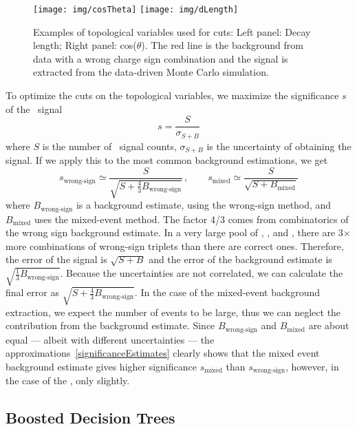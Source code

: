\begin{figure}[htb]
\centering
\texttt{[image: img/cosTheta]}
\texttt{[image: img/dLength]}
\caption{Examples of topological variables used for cuts: Left panel: Decay length; Right panel: cos($\theta$)\@. The red line is the background from data with a wrong charge sign combination and the signal is extracted from the data-driven Monte Carlo simulation.}
\label{fig:optimization}
\end{figure}

To optimize the cuts on the topological variables, we maximize the significance $s$ of the \Lambdac\ signal
\begin{equation} \label{significance}
 s = \frac{S}{\sigma_{S+B}}
\end{equation}
where $S$ is the number of \Lambdac\ signal counts, $\sigma_{S+B}$ is the uncertainty of obtaining the signal.
If we apply this to the most common background estimations, we get
\begin{equation} \label{significanceEstimates}
  s_\text{wrong-sign} \simeq \frac{S}{\sqrt{S+\frac{4}{3}B_\text{wrong-sign}}}\,, \qquad
 s_\text{mixed} \simeq \frac{S}{\sqrt{S + B_\text{mixed}}} 
\end{equation}
where $B_\text{wrong-sign}$ is a background estimate, using the wrong-sign method, and $B_\text{mixed}$ uses the mixed-event method. The factor 4/3 comes from combinatorics of the wrong sign background estimate. In a very large pool of \pipm, \Kmp, and \ppm, there are 3$\times$ more combinations of wrong-sign triplets than there are correct ones. Therefore, the error of the signal is $\sqrt{S + B}$ and the error of the background estimate is $\sqrt{\frac{1}{3}B_\text{wrong-sign}}$\@. Because the uncertainties are not correlated, we can calculate the final error as $\sqrt{S+\frac{4}{3}B_\text{wrong-sign}}$\@. In the case of the mixed-event background extraction, we expect the number of events to be large, thus we can neglect the contribution from the background estimate. Since $B_\text{wrong-sign}$ and $B_\text{mixed}$ are about equal --- albeit with different uncertainties --- the approximations~\eqref{significanceEstimates} clearly shows that the mixed event background estimate gives higher significance $s_\text{mixed}$ than $s_\text{wrong-sign}$, however, in the case of the \Lambdac, only slightly.

\subsection{Boosted Decision Trees}

